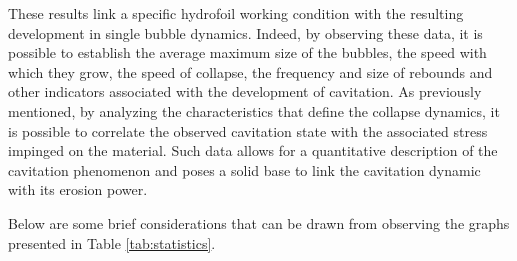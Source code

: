 These results link a specific hydrofoil working condition with the resulting development in single bubble dynamics. Indeed, by observing these data, it is possible to establish the average maximum size of the bubbles, the speed with which they grow, the speed of collapse, the frequency and size of rebounds and other indicators associated with the development of cavitation. 
As previously mentioned, by analyzing the characteristics that define the collapse dynamics, it is possible to correlate the observed cavitation state with the associated stress impinged on the material.  
Such data allows for a quantitative description of the cavitation phenomenon and poses a solid base to link the cavitation dynamic with its erosion power.

Below are some brief considerations that can be drawn from observing the graphs presented in Table \ref{tab:statistics}.

